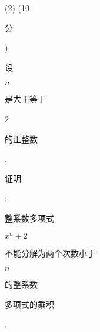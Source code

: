 \documentclass[10pt]{article}
\begin{document}
(2) (10 \begin{CJK}{UTF8}{mj}分\end{CJK}) \begin{CJK}{UTF8}{mj}设\end{CJK} $n$ \begin{CJK}{UTF8}{mj}是大于等于\end{CJK} 2 \begin{CJK}{UTF8}{mj}的正整数\end{CJK}. \begin{CJK}{UTF8}{mj}证明\end{CJK}: \begin{CJK}{UTF8}{mj}整系数多项式\end{CJK} $x^{n}+2$ \begin{CJK}{UTF8}{mj}不能分解为两个次数小于\end{CJK} $n$ \begin{CJK}{UTF8}{mj}的整系数\end{CJK} \begin{CJK}{UTF8}{mj}多项式的乘积\end{CJK}.
\end{document}
